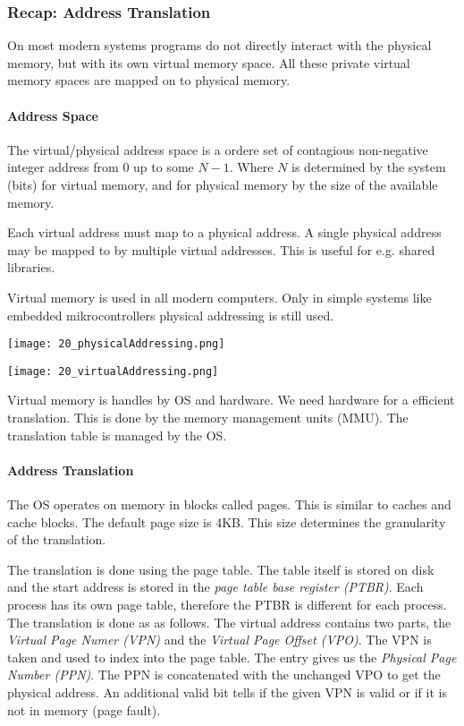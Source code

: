 

\subsubsection{Recap: Address Translation}
On most modern systems programs do not directly interact with the physical memory, but with its own virtual memory space. All these private virtual memory spaces are mapped on to physical memory.

\paragraph{Address Space}
The virtual/physical address space is a ordere set of contagious non-negative integer address from $0$ up to some $N - 1$. Where $N$ is determined by the system (bits) for virtual memory, and for physical memory by the size of the available memory.

Each virtual address must map to a physical address. A single physical address may be mapped to by multiple virtual addresses. This is useful for e.g. shared libraries.

Virtual memory is used in all modern computers. Only in simple systems like embedded mikrocontrollers physical addressing is still used.

\texttt{[image: 20\_physicalAddressing.png]}

\texttt{[image: 20\_virtualAddressing.png]}

Virtual memory is handles by OS and hardware. We need hardware for a efficient translation. This is done by the memory management units (MMU). The translation table is managed by the OS.

\paragraph{Address Translation}
The OS operates on memory in blocks called pages. This is similar to caches and cache blocks. The default page size is 4KB. This size determines the granularity of the translation.

The translation is done using the page table. The table itself is stored on disk and the start address is stored in the \textit{page table base register (PTBR)}. Each process has its own page table, therefore the PTBR is different for each process. The translation is done as as follows. The virtual address contains two parts, the \textit{Virtual Page Numer (VPN)} and the \textit{Virtual Page Offset (VPO)}. The VPN is taken and used to index into the page table. The entry gives us the \textit{Physical Page Number (PPN)}. The PPN is concatenated with the unchanged VPO to get the physical address. An additional valid bit tells if the given VPN is valid or if it is not in memory (page fault).

